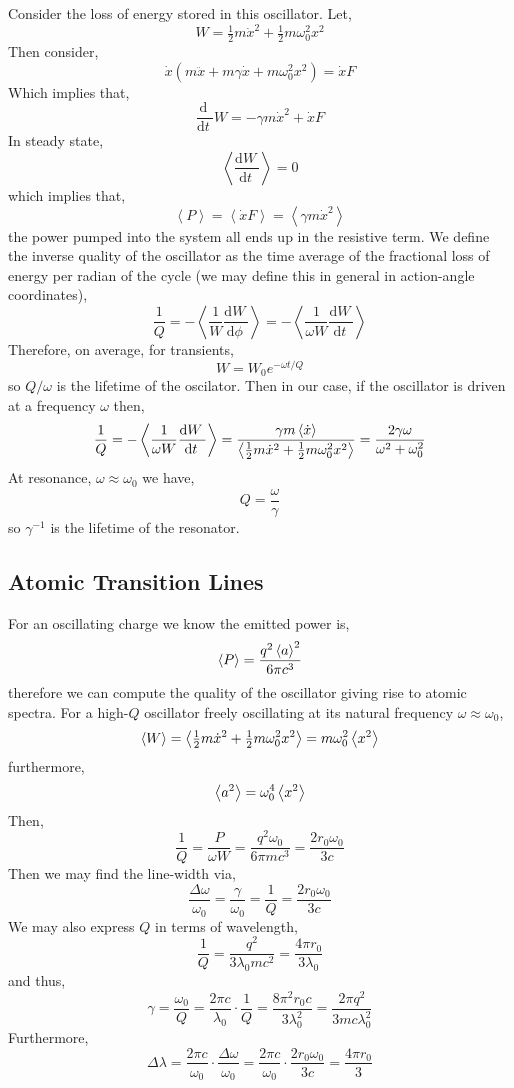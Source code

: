 \documentclass[12pt]{extarticle}
\renewcommand{\d}[1]{ \mathrm{d}#1 \:}
\newcommand{\deriv}[2]{\frac{\d{#1}}{\d{#2}}}
\theoremstyle{definition}
\begin{document}
Consider the loss of energy stored in this oscillator. Let,
\[ W = \tfrac{1}{2} m \dot{x}^2 + \tfrac{1}{2} m \omega_0^2 x^2 \]
Then consider,
\[ \dot{x} (m \ddot{x} + m \gamma \dot{x} + m \omega_0^2 x^2 ) = \dot{x} F \]
Which implies that,
\[ \deriv{}{t} W = - \gamma m \dot{x}^2 + \dot{x} F \]
In steady state,
\[ \left< \deriv{W}{t} \right> = 0 \]
which implies that,
\[ \left< P \right> = \left< \dot{x} F \right> = \left< \gamma m \dot{x}^2 \right> \]
the power pumped into the system all ends up in the resistive term. 
We define the inverse quality of the oscillator as the time average of the fractional loss of energy per radian of the cycle (we may define this in general in action-angle coordinates),
\[ \frac{1}{Q} = -\left< \frac{1}{W} \deriv{W}{\phi} \right> = -\left< \frac{1}{\omega W} \deriv{W}{t} \right> \]
Therefore, on average, for transients,
\[ W = W_0 e^{- \omega t / Q} \]
so $Q / \omega$ is the lifetime of the oscilator.
Then in our case, if the oscillator is driven at a frequency $\omega$ then,
\[ \frac{1}{Q} = -\left< \frac{1}{\omega W} \deriv{W}{t} \right> = \frac{\gamma m \EV{\dot{x}}}{\EV{\tfrac{1}{2} m \dot{x}^2 + \tfrac{1}{2} m \omega_0^2 x^2}} = \frac{2 \gamma \omega}{\omega^2 + \omega_0^2} \]
At resonance, $\omega \approx \omega_0$ we have,
\[ Q = \frac{\omega}{\gamma} \]
so $\gamma^{-1}$ is the lifetime of the resonator.

\subsection{Atomic Transition Lines}

For an oscillating charge we know the emitted power is,
\[ \left< P \right> = \frac{q^2 \left< a \right>^2}{6 \pi c^3} \]
therefore we can compute the quality of the oscillator giving rise to atomic spectra. For a high-$Q$ oscillator freely oscillating at its natural frequency $\omega \approx \omega_0$,
\[ \left< W \right> = \left< \tfrac{1}{2} m \dot{x}^2 + \tfrac{1}{2} m \omega_0^2 x^2 \right> = m \omega_0^2 \left< x^2 \right> \]
furthermore,
\[ \left< a^2 \right> = \omega_0^4 \left< x^2 \right> \]
Then,
\[ \frac{1}{Q} = \frac{P}{\omega W} = \frac{q^2 \omega_0}{6 \pi m c^3} = \frac{2r_0 \omega_0}{3 c} \]
Then we may find the line-width via,
\[ \frac{\Delta \omega}{\omega_0} = \frac{\gamma}{\omega_0} = \frac{1}{Q} = \frac{2r_0 \omega_0}{3 c} \]
We may also express $Q$ in terms of wavelength,
\[ \frac{1}{Q} = \frac{q^2}{3 \lambda_0 m c^2} = \frac{4 \pi r_0}{3 \lambda_0} \]
and thus,
\[ \gamma = \frac{\omega_0}{Q} = \frac{2 \pi c}{\lambda_0} \cdot \frac{1}{Q} = \frac{8 \pi^2 r_0 c}{3 \lambda_0^2} = \frac{2 \pi q^2}{3 mc \lambda_0^2} \]
Furthermore, 
\[ \Delta \lambda = \frac{2 \pi c}{\omega_0} \cdot \frac{\Delta \omega}{\omega_0} = \frac{2 \pi c}{\omega_0} \cdot \frac{2r_0 \omega_0}{3 c} = \frac{4 \pi r_0}{3} \]
\end{document}
